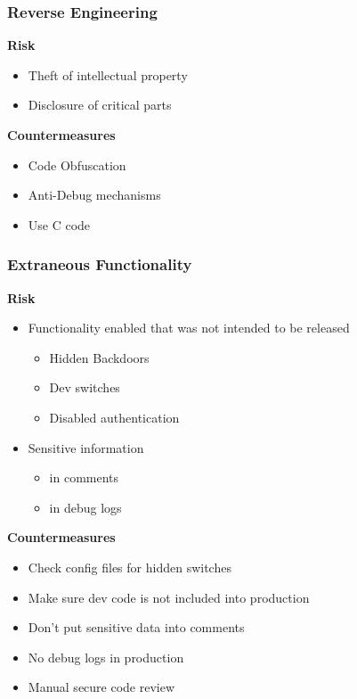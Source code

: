 \subsubsection{Reverse Engineering}
\textbf{Risk}
\begin{itemize}
    \item Theft of intellectual property
    \item Disclosure of critical parts
\end{itemize}
\textbf{Countermeasures}
\begin{itemize}
    \item Code Obfuscation
    \item Anti-Debug mechanisms
    \item Use C code
\end{itemize}

\subsubsection{Extraneous Functionality}
\textbf{Risk}
\begin{itemize}
    \item Functionality enabled that was not intended to be released
    \begin{itemize}
        \item Hidden Backdoors
        \item Dev switches
        \item Disabled authentication
    \end{itemize}
    \item Sensitive information
    \begin{itemize}
        \item in comments
        \item in debug logs
    \end{itemize}
\end{itemize}
\textbf{Countermeasures}
\begin{itemize}
    \item Check config files for hidden switches
    \item Make sure dev code is not included into production
    \item Don't put sensitive data into comments
    \item No debug logs in production
    \item Manual secure code review
\end{itemize}

\columnbreak
